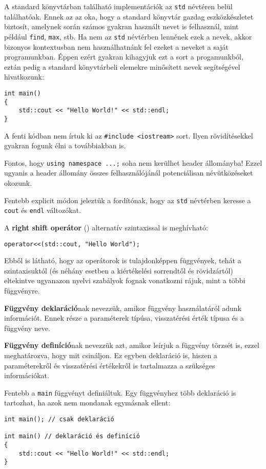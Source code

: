 \documentclass[a4paper,11.5pt,table]{article}
\begin{document}
	A standard könyvtárban található implementációk az \texttt{std} névtéren belül találhatóak. Ennek az az oka, hogy a standard könyvtár gazdag eszközkészletet biztosít, amelynek során számos gyakran használt nevet is felhasznál, mint például \texttt{find}, \texttt{max}, stb. Ha nem az \texttt{std} névtérben lennének ezek a nevek, akkor bizonyos kontextusban nem használhatnánk fel ezeket a neveket a saját programunkban. Éppen ezért gyakran kihagyjuk ezt a sort a progamunkból, eztán pedig a standard könyvtárbeli elemekre minősített nevek segítségével hivatkozunk:
	\begin{lstlisting}
int main()
{
	std::cout << "Hello World!" << std::endl;
}
	\end{lstlisting}
	\begin{note}
		A fenti kódban nem írtuk ki az \texttt{\#include <iostream>} sort. Ilyen rövidítésekkel gyakran fogunk élni a továbbiakban is. 
	\end{note}

	Fontos, hogy \texttt{using namespace ...;} soha nem kerülhet header állományba! Ezzel ugyanis a header állomány összes felhasználójánál potenciálisan névütközéseket okozunk.

	Fentebb explicit módon jeleztük a fordítónak, hogy az \texttt{std} névtérben keresse a \texttt{cout} és \texttt{endl} változókat.
	
	\medskip
	A \textbf{right shift operátor} (\texttt{\<}) alternatív szintaxissal is meghívható:
	\begin{lstlisting}
operator<<(std::cout, "Hello World");
	\end{lstlisting}
	Ebből is látható, hogy az operátorok is tulajdonképpen függvények, tehát a szintaxisuktól (és néhány esetben a kiértékelési sorrendtől és rövidzártól) eltekintve ugyanazon nyelvi szabályok fognak vonatkozni rájuk, mint a többi függvényre.
	
	\medskip
	\textbf{Függvény deklaráció}nak nevezzük, amikor függvény használatáról adunk információt. Ennek része a paraméterek típúsa, visszatérési érték típusa és a függvény neve.
	
	\medskip
	\textbf{Függvény definíció}nak nevezzük azt, amikor leírjuk a függvény törzsét is, ezzel meghatározva, hogy mit csináljon. Ez egyben deklaráció is, hiszen a paraméterekről és visszatérési értékekről is tartalmazza a szükséges információkat.
	
	\medskip
	Fentebb a \texttt{main} függvényt definiáltuk. Egy függvényhez több deklaráció is tartozhat, ha azok nem mondanak egymásnak ellent:
	\begin{lstlisting}
int main(); // csak deklaráció	

int main() // deklaráció és definíció
{
	std::cout << "Hello World!" << std::endl;
}
	\end{lstlisting}
\end{document}
